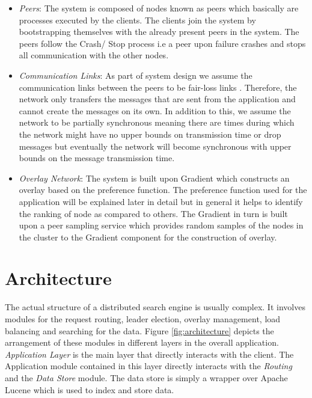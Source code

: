 \documentclass[a4paper,11pt]{kth-mag}
\begin{document}
\begin{itemize}

\item \textit{Peers}: The system is composed of nodes known as peers which basically are processes executed by the clients. The clients join the system by bootstrapping themselves with the already present peers in the system. The peers follow the Crash/ Stop process \cite{guerraoui} i.e a peer upon failure crashes and stops all communication with the other nodes.


\item \textit{Communication Links}: As part of system design we assume the communication links between the peers to be fair-loss links \cite{guerraoui}. Therefore, the network only transfers the messages that are sent from the application and cannot create the messages on its own. In addition to this, we assume the network to be partially synchronous meaning there are times during which the network might have no upper bounds on transmission time or drop messages but eventually the network will become synchronous with upper bounds on the message transmission time.

\item \textit{Overlay Network}: The system is built upon Gradient \cite{sacha2006discovery} which constructs an overlay based on the preference function. The preference function used for the application will be explained later in detail but in general it helps to identify the ranking of node as compared to others. The Gradient in turn is built upon a peer sampling service which provides random samples of the nodes in the cluster to the Gradient component for the construction of overlay.

\end{itemize}





\section{Architecture}
\label{sec:architecture}

The actual structure of a distributed search engine is usually complex. It involves modules for the request routing, leader election, overlay management, load balancing and searching for the data. Figure \ref{fig:architecture} depicts the arrangement of these modules in different layers in the overall application. \textit{Application Layer} is the main layer that directly interacts with the client. The Application module contained in this layer directly interacts with the \textit{Routing} and the \textit{Data Store} module. The data store is simply a wrapper over Apache Lucene which is used to index and store data.
\end{document}
